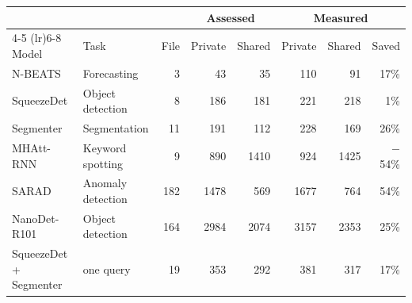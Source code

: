\begin{tabular}{llrrrrrr}
\toprule
 & & & \multicolumn{2}{c}{Assessed} & \multicolumn{3}{c}{Measured} \\
\cmidrule(lr){4-5} \cmidrule(lr){6-8}
Model & Task & File & Private & Shared & Private & Shared & Saved \\
\midrule
N-BEATS & Forecasting & 3 & 43 & 35 & 110 & 91 & 17\% \\
SqueezeDet & Object detection & 8 & 186 & 181 & 221 & 218 & 1\% \\
Segmenter & Segmentation & 11 & 191 & 112 & 228 & 169 & 26\% \\
MHAtt-RNN & Keyword spotting & 9 & 890 & 1410 & 924 & 1425 & $-$54\% \\
SARAD & Anomaly detection & 182 & 1478 & 569 & 1677 & 764 & 54\% \\
NanoDet-R101 & Object detection & 164 & 2984 & 2074 & 3157 & 2353 & 25\% \\
\midrule
SqueezeDet + Segmenter & one query & 19 & 353 & 292 & 381 & 317 & 17\% \\
\bottomrule
\end{tabular}
